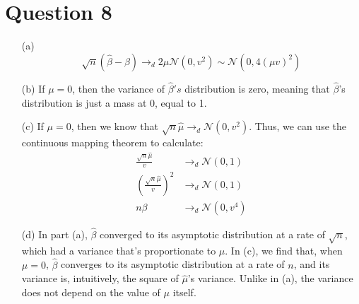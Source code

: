 \documentclass{article}
\newcommand{\N}{\mathcal{N}}
\begin{document}
\section*{Question 8}
\begin{itemize}
	\item[(a)] 
		\[
			\sqrt{n}(\hat{\beta}-\beta)\rightarrow_d2\mu\N(0,v^2)\sim\N(0,4(\mu v)^2)
		\]
	\item[(b)] If $\mu=0$, then the variance of $\hat{\beta}'s$ distribution is zero, meaning that $\hat{\beta}$'s distribution is just a mass at 0, equal to 1.
	\item[(c)] If $\mu=0$, then we know that $\sqrt{n}\hat{\mu}\rightarrow_d\N(0,v^2)$. Thus, we can use the continuous mapping theorem to calculate:
		\begin{align*}
			\frac{\sqrt{n}\hat{\mu}}{v}					&\rightarrow_d\N(0,1)			\\
			\left(\frac{\sqrt{n}\hat{\mu}}{v}\right)^2	&\rightarrow_d\N(0,1)			\\
			n\beta										&\rightarrow_d\N(0,v^4)
		\end{align*}
	\item[(d)] In part (a), $\hat{\beta}$ converged to its asymptotic distribution at a rate of $\sqrt{n}$, which had a variance that's proportionate to $\mu$. In (c), we find that, when $\mu=0$, $\hat{\beta}$ converges to its asymptotic distribution at a rate of $n$, and its variance is, intuitively, the square of $\hat{\mu}$'s variance. Unlike in (a), the variance does not depend on the value of $\mu$ itself.
\end{itemize}



\end{document}

